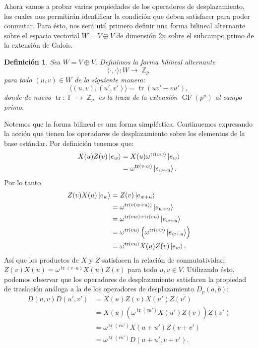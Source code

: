 \documentclass[a4paper]{report}
\DeclareMathOperator{\Z}{\mathbb{Z}}
\DeclareMathOperator{\F}{\mathbb{F}}
\DeclareMathOperator{\tr}{tr}
\DeclareMathOperator{\GF}{GF}
\newtheorem{definition}{Definición}
\begin{document}
  Ahora vamos a probar varias propiedades de los operadores
  de desplazamiento, las cuales nos permitirán identificar
  la condición que deben satisfacer para poder conmutar.
  Para ésto, nos será util primero definir una forma
  bilineal alternante sobre el espacio vectorial $W = V
  \oplus V$ de dimensión $2n$ sobre el subcampo primo de la
  extensión de Galois. 
  \begin{definition}
    Sea $W = V \oplus V$. Definimos la forma bilineal
    alternante 
    \[
      \langle \cdot, \cdot \rangle : W \to \Z_p
    \]
    para todo $(u,v) \in W$ de la siguiente manera:
    \begin{equation}
      \label{eqn:bilinear_form}
      \langle (u,v), (u',v') \rangle
      = \tr\left( u v' - v u' \right),
    \end{equation}
    donde de nuevo $\tr : \F \to \Z_p$ es la traza de la
    extensión $\GF(p^{n})$ al campo primo. 
  \end{definition}
  Notemos que la forma bilineal es una forma simpléctica.
  Continuemos expresando la acción que tienen los operadores
  de desplazamiento sobre los elementos de la base estándar.
  Por definición tenemos que:
  \begin{align}
    X(u)Z(v) \ket{e_w}
    &= X(u) \omega^{\tr(v w)} \ket{e_w} \\
    &= \omega^{\tr(v \cdot w)} \ket{e_{w+u}}.
  \end{align}
  Por lo tanto
  \begin{align}
    Z(v)X(u) \ket{e_w}
    &= Z(v) \ket{e_{w+u}} \\
    &= \omega^{\tr(v (w+u))} \ket{e_{w+u}} \\
    &= \omega^{\tr(v w) + \tr(v u)}
    \ket{e_{w+u}} \\
    &= \omega^{\tr(v u)} \left( \omega^{\tr(v
    w)} \ket{e_{w+u}} \right) \\
    &= \omega^{\tr(v u)} X(u)Z(v) \ket{e_{w}}.
  \end{align}
  Así que los productos de $X$ y $Z$ satisfacen la relación
  de conmutatividad: $Z(v)X(u) = \omega^{\tr(v \cdot u)}
  X(u)Z(v)$ para todo $u,v \in V$. Utilizando ésto, podemos
  observar que los operadores de desplazamiento satisfacen
  la propiedad de traslación análoga a la de los operadores
  de desplazamiento $D_p(a,b)$:
  \begin{align}
    D(u,v) D(u',v')
    &= X(u)Z(v) X(u')Z(v') \\
    &= X(u) \left( \omega^{\tr(v u')} X(u') Z(v)
    \right) Z(v') \\
    &= \omega^{\tr(v u')} X(u+u') Z(v + v') \\
    &= \omega^{\tr(v u')} D(u+u',v+v')
    \label{eqn:disp_product_relation}.
  \end{align}
\end{document}
